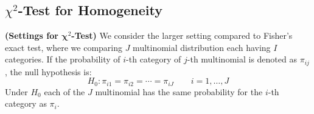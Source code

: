 \subsection{$\chi^2$-Test for Homogeneity}

\begin{remark}{\textbf{(Settings for $\boldsymbol \chi^2$-Test)}}
    We consider the larger setting compared to Fisher's exact test, where we comparing $J$ multinomial distribution each having $I$ categories. If the probability of $i$-th category of $j$-th multinomial is denoted as $\pi_{ij}$, the null hypothesis is:
    \begin{equation*}
        H_0 : \pi_{i1} = \pi_{i2} = \cdots = \pi_{iJ} \qquad i = 1,\dots,J
    \end{equation*}
    Under $H_0$ each of the $J$ multinomial has the same probability for the $i$-th category as $\pi_i$. 
\end{remark}


